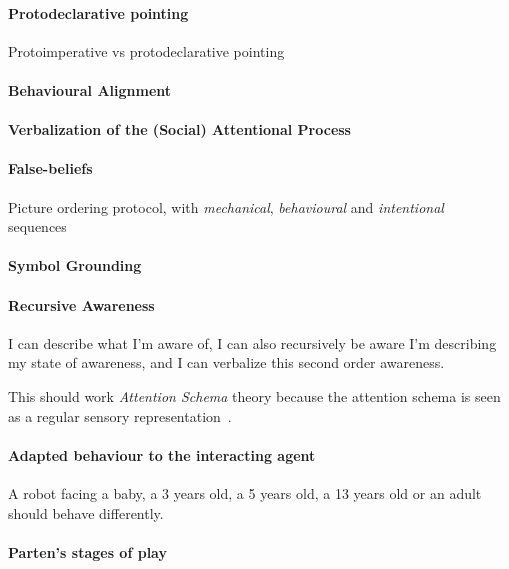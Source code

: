 \documentclass[a4paper]{article}
\begin{document}
\paragraph{Protodeclarative pointing}

Protoimperative vs protodeclarative pointing~\cite{baron1986perceptual}

\paragraph{Behavioural Alignment}
\paragraph{Verbalization of the (Social) Attentional Process}
\paragraph{False-beliefs}


Picture ordering protocol, with \emph{mechanical}, \emph{behavioural} and
\emph{intentional} sequences~\cite{baron1986mechanical}

\paragraph{Symbol Grounding}

\paragraph{Recursive Awareness}

I can describe what I'm aware of, I can also recursively be aware I'm describing
my state of awareness, and I can verbalize this second order awareness.

This should work \emph{Attention Schema} theory because the attention schema
is seen as a regular sensory
representation~\citep[p.55]{graziano2013consciousness}.

\paragraph{Adapted behaviour to the interacting agent}

A robot facing a baby, a 3 years old, a 5 years old, a 13 years old or an adult
should behave differently.


\paragraph{Parten's stages of play}
\end{document}
